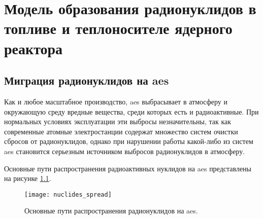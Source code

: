 \chapter{Модель образования радионуклидов в топливе и теплоносителе ядерного реактора}

\section{Миграция радионуклидов на \ac{aes}}

Как и любое масштабное производство, \ac{aes} выбрасывает в атмосферу и окружающую среду вредные вещества, среди 
которых есть и радиоактивные. При нормальных условиях эксплуатации эти выбросы незначительны, так как современные 
атомные электростанции содержат множество систем очистки сбросов от радионуклидов, однако при нарушении работы 
какой-либо из систем \ac{aes} становится серьезным источником выбросов радионуклидов в атмосферу.

Основные пути распространения радиоактивных нуклидов на \ac{aes} представлены на рисунке \ref{fig_nuclides_spread}.

\begin{figure}[ht]
\centering
	\texttt{[image: nuclides\_spread]}
    \caption{Основные пути распространения радионуклидов на \ac{aes}.}
    \label{fig_nuclides_spread}
\end{figure}

